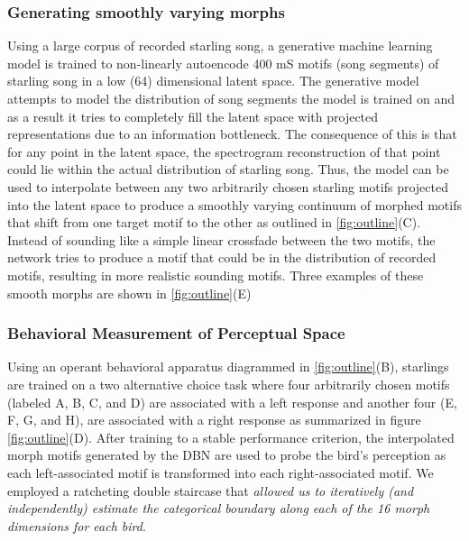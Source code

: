 

\subsubsection{Generating smoothly varying morphs}

Using a large corpus of recorded starling song, a generative machine learning model is trained to non-linearly autoencode 400 mS motifs (song segments) of starling song in a low (64) dimensional latent space. The generative model attempts to model the distribution of song segments the model is trained on and as a result it tries to completely fill the latent space with projected representations due to an information bottleneck. The consequence of this is that for any point in the latent space, the spectrogram reconstruction of that point could lie within the actual distribution of starling song. Thus, the model can be used to interpolate between any two arbitrarily chosen starling motifs projected into the latent space to produce a smoothly varying continuum of morphed motifs that shift from one target motif to the other as outlined in \ref{fig:outline}(C). Instead of sounding like a simple linear crossfade between the two motifs, the network tries to produce a motif that could be in the distribution of recorded motifs, resulting in more realistic sounding motifs. Three examples of these smooth morphs are shown in \ref{fig:outline}(E) 

\subsubsection{Behavioral Measurement of Perceptual Space}

Using an operant behavioral apparatus diagrammed in \ref{fig:outline}(B), starlings are trained on a two alternative choice task where four arbitrarily chosen motifs (labeled A, B, C, and D) are associated with a left response and another four (E, F, G, and H), are associated with a right response as summarized in figure \ref{fig:outline}(D). After training to a stable performance criterion, the interpolated morph motifs generated by the \ac{DBN} are used to probe the bird's perception as each left-associated motif is transformed into each right-associated motif. We employed a ratcheting double staircase that \emph{allowed us to iteratively (and independently) estimate the categorical boundary along each of the 16 morph dimensions for each bird}. 



